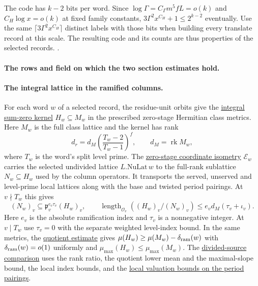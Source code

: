 %
The code has \(k-2\) bits per word. Since
\(\log\Gamma=C_\Gamma m^5 f L=o(k)\) and \(C_H\log x=o(k)\) at fixed
family constants, \(3\Gamma^2x^{C_H}+1\le2^{k-2}\) eventually.
Use the same \(\lceil3\Gamma^2x^{C_H}\rceil\) distinct labels with those
bits when building every translate record at this scale. The
resulting code and its counts are thus properties of the selected
records.
.

\paragraph{The rows and field on which the two section estimates hold.}
%


\paragraph{The integral lattice in the ramified columns.}
%
For each word \(w\) of a selected record, the residue-unit orbits
give the \hyperlink{proof.ramified-residue-orbits}{integral sum-zero kernel}
\(H_w\subseteq M_w\) in the prescribed zero-stage Hermitian class
metrics. Here \(M_w\) is the full class lattice and the kernel has rank
\[
 d_r=d_M\left(\frac{T_w-2}{T_w-1}\right)^f,\qquad
  d_M=\operatorname{rk}M_w,
\]
where \(T_w\) is the word's split level prime. The
\hyperlink{proof.selected-undivided-donor}{zero-stage coordinate isometry}
\(\mathcal E_w\) carries the selected undivided lattice
\(L.\mathrm{NuLat}\,w\) to the full-rank sublattice \(N_w\subseteq H_w\)
used by the column operators. It transports the served, unserved
and level-prime local lattices along with the base and twisted
period pairings. At \(v\nmid T_w\) this gives
\[
 (N_w)_v\subseteq\mathfrak p_v^{e_v\tau_v}(H_w)_v,\qquad
 \operatorname{length}_{\mathcal O_v}((H_w)_v/(N_w)_v)
     \le e_v d_M(\tau_v+\iota_v).
\]
Here \(e_v\) is the absolute ramification index and
\(\tau_v\) is a nonnegative integer. At \(v\mid T_w\) use
\(\tau_v=0\) with the separate weighted level-index bound.
In the same metrics, the
\hyperlink{proof.ramified-kernel-lower-mean}{quotient estimate}
gives \(\mu(H_w)\ge\mu(M_w)-\delta_{\rm ram}(w)\) with
\(\delta_{\rm ram}(w)=o(1)\) uniformly and
\(\mu_{\max}(H_w)\le\mu_{\max}(M_w)\).
The \hyperlink{proof.divided-column-slopes}{divided-source comparison}
uses the rank ratio, the quotient lower mean and the maximal-slope
bound, the local index bounds, and the
\hyperlink{proof.period-gain-tests}{local valuation bounds on the
period pairings}.

